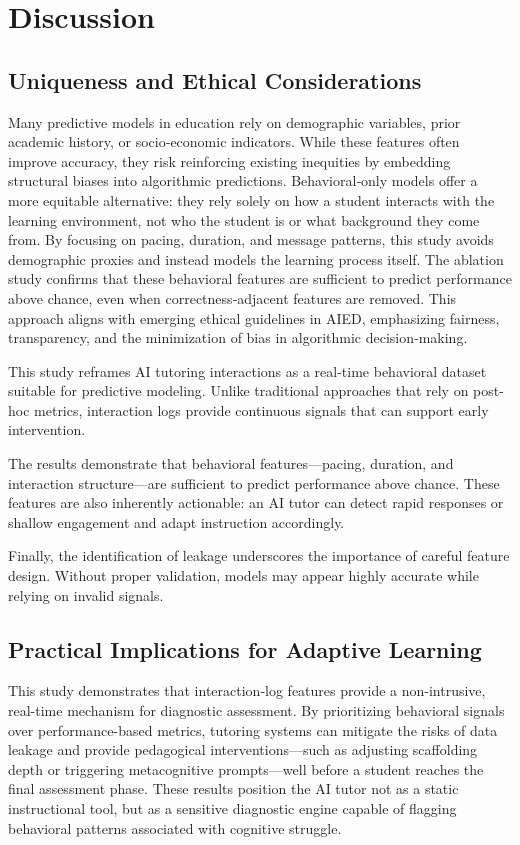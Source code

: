 \documentclass[conference]{IEEEtran}
\begin{document}
\section{Discussion}

\subsection{Uniqueness and Ethical Considerations}

Many predictive models in education rely on demographic variables, prior academic history, or socio‑economic indicators. While these features often improve accuracy, they risk reinforcing existing inequities by embedding structural biases into algorithmic predictions. Behavioral‑only models offer a more equitable alternative: they rely solely on how a student interacts with the learning environment, not who the student is or what background they come from. By focusing on pacing, duration, and message patterns, this study avoids demographic proxies and instead models the learning process itself. The ablation study confirms that these behavioral features are sufficient to predict performance above chance, even when correctness‑adjacent features are removed. This approach aligns with emerging ethical guidelines in AIED, emphasizing fairness, transparency, and the minimization of bias in algorithmic decision‑making.

This study reframes AI tutoring interactions as a real-time behavioral dataset suitable for predictive modeling. Unlike traditional approaches that rely on post-hoc metrics, interaction logs provide continuous signals that can support early intervention.

The results demonstrate that behavioral features—pacing, duration, and interaction structure—are sufficient to predict performance above chance. These features are also inherently actionable: an AI tutor can detect rapid responses or shallow engagement and adapt instruction accordingly.

 Finally, the identification of leakage underscores the importance of careful feature design. Without proper validation, models may appear highly accurate while relying on invalid signals.

\subsection{Practical Implications for Adaptive Learning}

This study demonstrates that interaction-log features provide a non-intrusive, real-time mechanism for diagnostic assessment. By prioritizing behavioral signals over performance-based metrics, tutoring systems can mitigate the risks of data leakage and provide pedagogical interventions—such as adjusting scaffolding depth or triggering metacognitive prompts—well before a student reaches the final assessment phase. These results position the AI tutor not as a static instructional tool, but as a sensitive diagnostic engine capable of flagging behavioral patterns associated with cognitive struggle.
\end{document}
